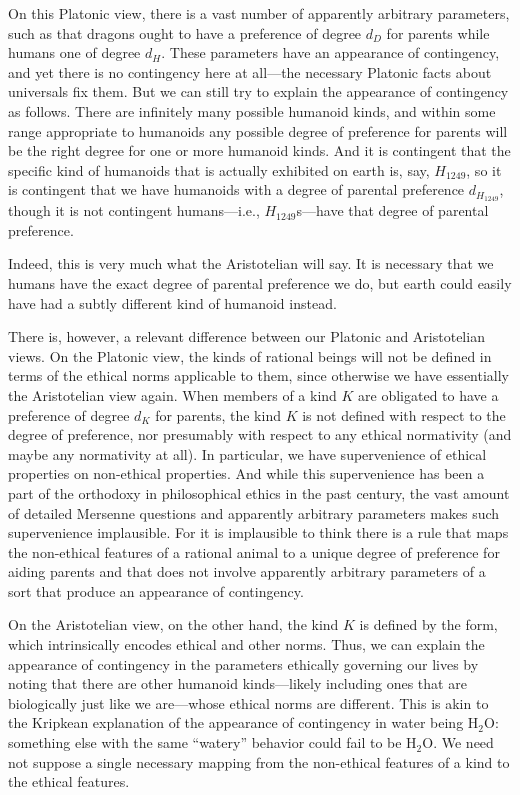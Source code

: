 On this Platonic view, there is a vast number of apparently arbitrary parameters, such as that dragons
ought to have a preference of degree $d_D$ for parents while humans one of degree $d_H$. These parameters
have an appearance of contingency, and yet there is no contingency here at all---the necessary Platonic facts 
about universals fix them. But we can still try to explain the appearance of contingency as follows.
There are infinitely many possible humanoid kinds, and within some range appropriate to humanoids any 
possible degree of preference for parents will be the right degree for one or more humanoid kinds. And it is
contingent that the specific kind of humanoids that is actually exhibited on earth is, say, $H_{1249}$, so it 
is contingent that we have humanoids with a degree of parental preference $d_{H_{1249}}$, though it is not 
contingent humans---i.e., $H_{1249}$s---have that degree of parental preference.

Indeed, this is very much what the Aristotelian will say. It is necessary that we humans have the exact degree
of parental preference we do, but earth could easily have had a subtly different kind of humanoid instead.

There is, however, a relevant difference between our Platonic and Aristotelian views. On the Platonic
view, the kinds of rational beings will not be defined in terms of the ethical norms applicable to them,
since otherwise we have essentially the Aristotelian view again.
When members of a kind $K$ are obligated to have a preference of degree $d_K$ for parents, the kind $K$ is not 
defined with respect to the degree of preference, nor presumably with respect to any ethical normativity
(and maybe any normativity at all). In particular, we have supervenience of ethical properties on non-ethical
properties. And while this supervenience has been a part of the orthodoxy in philosophical ethics in the past century, the
vast amount of detailed Mersenne questions and apparently arbitrary parameters makes such supervenience 
implausible. For it is implausible to think there is a rule that maps the non-ethical features of 
a rational animal to a unique degree of preference for aiding parents and that does not involve apparently
arbitrary parameters of a sort that produce an appearance of contingency.

On the Aristotelian view, on the other hand, the kind $K$ is defined by the form, which intrinsically
encodes ethical and other norms. Thus, we can explain the appearance of contingency in the parameters
ethically governing our lives by noting that there are other humanoid kinds---likely including ones that
are biologically just like we are---whose ethical norms are different. This is akin to the Kripkean
explanation of the appearance of contingency in water being H$_2$O: something else with the same
``watery'' behavior could fail to be H$_2$O. We need not suppose a single necessary mapping from
the non-ethical features of a kind to the ethical features.

